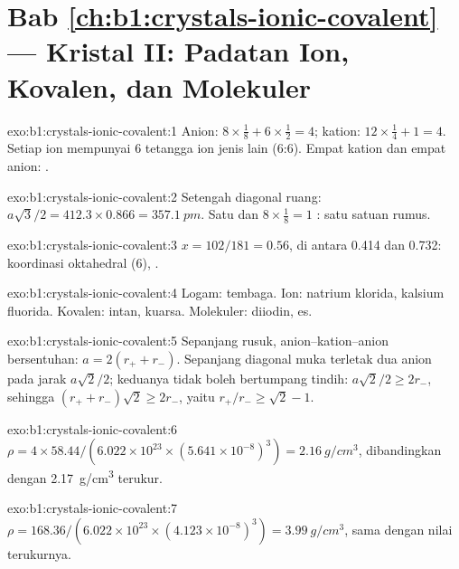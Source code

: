 \section*{Bab \ref{ch:b1:crystals-ionic-covalent} --- Kristal II: Padatan Ion, Kovalen, dan Molekuler}

\begin{solution}{exo:b1:crystals-ionic-covalent:1}
Anion: $8 \times \frac18 + 6 \times \frac12 = 4$; kation: $12 \times
\frac14 + 1 = 4$. Setiap ion mempunyai 6 tetangga ion jenis lain (6:6).
Empat kation dan empat anion: .
\end{solution}

\begin{solution}{exo:b1:crystals-ionic-covalent:2}
Setengah diagonal ruang: $a\sqrt3/2 = 412.3 \times 0.866 = \qty{357.1}{pm}$.
Satu  dan $8 \times \frac18 = 1$ : satu satuan rumus.
\end{solution}

\begin{solution}{exo:b1:crystals-ionic-covalent:3}
$x = 102/181 = 0.56$, di antara 0.414 dan 0.732: koordinasi oktahedral
(6), .
\end{solution}

\begin{solution}{exo:b1:crystals-ionic-covalent:4}
Logam: tembaga. Ion: natrium klorida, kalsium fluorida. Kovalen: intan,
kuarsa. Molekuler: diiodin, es.
\end{solution}

\begin{solution}{exo:b1:crystals-ionic-covalent:5}
Sepanjang rusuk, anion--kation--anion bersentuhan: $a = 2(r_+ + r_-)$.
Sepanjang diagonal muka terletak dua anion pada jarak $a\sqrt2/2$;
keduanya tidak boleh bertumpang tindih: $a\sqrt2/2 \ge 2r_-$, sehingga
$(r_+ + r_-)\sqrt2 \ge 2r_-$, yaitu $r_+/r_- \ge \sqrt2 - 1$.
\end{solution}

\begin{solution}{exo:b1:crystals-ionic-covalent:6}
$\rho = 4 \times 58.44/(6.022 \times 10^{23} \times (5.641 \times
10^{-8})^3) = \qty{2.16}{g/cm^3}$, dibandingkan dengan \qty{2.17}{g/cm^3}
terukur.
\end{solution}

\begin{solution}{exo:b1:crystals-ionic-covalent:7}
$\rho = 168.36/(6.022 \times 10^{23} \times (4.123 \times 10^{-8})^3) =
\qty{3.99}{g/cm^3}$, sama dengan nilai terukurnya.
\end{solution}

